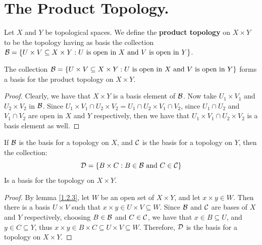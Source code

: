 
\section{The Product Topology.}

\begin{definition}
    Let $X$ and $Y$ be topological spaces. We define the \textbf{product topology} on 
    $X \times Y$ to be the topology having as basis the collection  $\mathcal{B}=\{U \times V \subseteq X \times Y:
    U \text{ is open in } X \text{ and } V \text{ is open in } Y\}$.
\end{definition}

\begin{theorem}\label{1.4.1}
    The collection $\mathcal{B}=\{U \times V \subseteq X \times Y: U \text{ is open in } X \text{ and } V 
    \text{ is open in } Y\}$ forms a basis for the product topology on $X \times Y$.
\end{theorem}
\begin{proof}
    Clearly, we have that $X \times Y$ is a basis element of  $\mathcal{B}$. Now take  $U_1 \times V_1$ 
    and $U_2 \times V_2$ in $\mathcal{B}$. Since  $U_1 \times V_1 \cap U_2 \times V_2=U_1 \cap U_2 \times V_1 \cap V_2$, 
    since $U_1 \cap U_2$ and $V_1 \cap V_2$ are open in $X$ and  $Y$ respectively, then 
    we have that $U_1 \times V_1 \cap U_2 \times V_2$ is a basis element as well.
\end{proof}

\begin{theorem}\label{1.4.2}
    If $\mathcal{B}$ is the basis for a topology on  $X$, and  $\mathcal{C}$ is the basis for a 
    topology on  $Y$, then the collection:
        \begin{equation*}
            \mathcal{D}=\{B \times C: B \in \mathcal{B} \text{ and } C \in \mathcal{C}\}
        \end{equation*}
    Is a basis for the topology on $X \times Y$.
\end{theorem}
\begin{proof}
    By lemma \ref{1.2.3}, let $W$ be an open set of  $X \times Y$, and let  $x \times y \in W$. 
    Then there is a basis  $U \times V$ such that  $x \times y \in U \times V \subseteq W$. Since  $\mathcal{B}$ 
    and  $\mathcal{C}$ are bases of  $X$ and  $Y$ respectively, choosing  $B \in \mathcal{B}$ and  $C \in \mathcal{C}$, 
    we have that  $x \in B \subseteq U$, and  $y \in C \subseteq Y$, thus  $x \times y \in B \times C \subseteq U \times V \subseteq W$. 
    Therefore, $\mathcal{D}$ is the basis for a topology on  $X \times Y$.
\end{proof}


